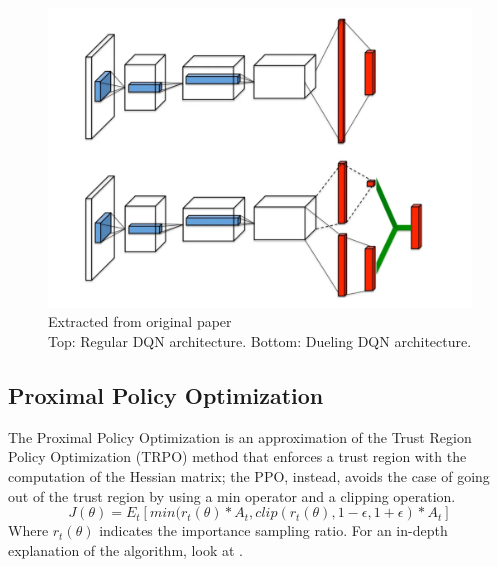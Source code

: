 \documentclass{article}
\begin{document}
\begin{figure}
    \centering
    \includegraphics[width=0.7\linewidth]{img/duel_image.pdf}
    \caption{Extracted from original paper \cite{DuelDeepQNetwork} \\ Top: Regular DQN architecture. Bottom: Dueling DQN architecture.}
    \label{fig:duel_comparison_vanilla}
\end{figure}

\subsection{Proximal Policy Optimization}
The Proximal Policy Optimization is an approximation of the Trust Region Policy Optimization (TRPO) \cite{TRPO} method that enforces a trust region with the computation of the Hessian matrix; the PPO, instead, avoids the case of going out of the trust region by using a min operator and a clipping operation.
\begin{equation}
    J(\theta) = E_t [min(r_t(\theta) * A_t, clip(r_t(\theta), 1 - \epsilon, 1 + \epsilon) * A_t]
\end{equation}
Where $r_t(\theta)$ indicates the importance sampling ratio. For an in-depth explanation of the algorithm, look at \cite{PPO}.
\end{document}
